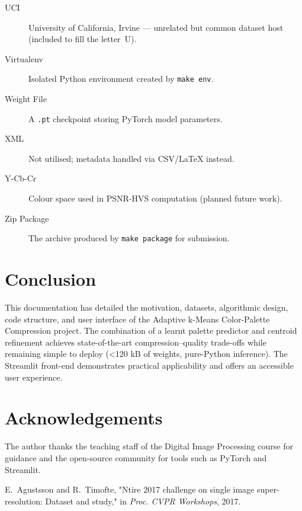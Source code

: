 \documentclass[11pt]{article}
\begin{document}
\begin{description}
\item[UCI] University of California, Irvine — unrelated but common dataset host (included to fill the letter~U).
\item[Virtualenv] Isolated Python environment created by \texttt{make env}.
\item[Weight File] A \texttt{.pt} checkpoint storing PyTorch model parameters.
\item[XML] Not utilised; metadata handled via CSV/LaTeX instead.
\item[Y-Cb-Cr] Colour space used in PSNR-HVS computation (planned future work).
\item[Zip Package] The archive produced by \texttt{make package} for submission.
\end{description}

\section{Conclusion}
This documentation has detailed the motivation, datasets, algorithmic design, code structure, and user interface of the Adaptive k-Means Color-Palette Compression project. The combination of a learnt palette predictor and centroid refinement achieves state-of-the-art compression–quality trade-offs while remaining simple to deploy (\textless120 kB of weights, pure-Python inference). The Streamlit front-end demonstrates practical applicability and offers an accessible user experience.

\section*{Acknowledgements}
The author thanks the teaching staff of the Digital Image Processing course for guidance and the open-source community for tools such as PyTorch and Streamlit.


\begin{thebibliography}{1}
E.~Agustsson and R.~Timofte, "Ntire 2017 challenge on single image super-resolution: Dataset and study," in \emph{Proc. CVPR Workshops}, 2017.
\end{thebibliography}
\end{document}

